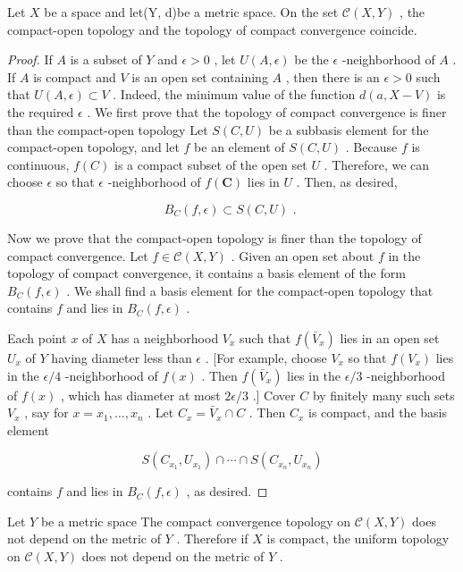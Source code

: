 \begin{theorem} Let \(X\) be a space and let(Y, d)be a metric space. On the set \(\mathcal{C}\left( {X,Y}\right)\) , the compact-open topology and the topology of compact convergence coincide.
\end{theorem}

\begin{proof}If \(A\) is a subset of \(Y\) and \(\epsilon  > 0\) , let \(U\left( {A,\epsilon }\right)\) be the \(\epsilon\) -neighborhood of \(A\) . If \(A\) is compact and \(V\) is an open set containing \(A\) , then there is an \(\epsilon  > 0\) such that \(U\left( {A,\epsilon }\right)  \subset  V\) . Indeed, the minimum value of the function \(d\left( {a,X - V}\right)\) is the required \(\epsilon\) .
We first prove that the topology of compact convergence is finer than the compact-open topology Let \(S\left( {C,U}\right)\) be a subbasis element for the compact-open topology, and let \(f\) be an element of \(S\left( {C,U}\right)\) . Because \(f\) is continuous, \(f\left( C\right)\) is a compact subset of the open set \(U\) . Therefore, we can choose \(\epsilon\) so that \(\epsilon\) -neighborhood of \(f\left( \mathbf{C}\right)\) lies in \(U\) . Then, as desired,

\[
{B}_{C}\left( {f,\epsilon }\right)  \subset  S\left( {C,U}\right) \text{ . }
\]

Now we prove that the compact-open topology is finer than the topology of compact convergence. Let \(f \in  \mathcal{C}\left( {X,Y}\right)\) . Given an open set about \(f\) in the topology of compact convergence, it contains a basis element of the form \({B}_{C}\left( {f,\epsilon }\right)\) . We shall find a basis element for the compact-open topology that contains \(f\) and lies in \({B}_{C}\left( {f,\epsilon }\right)\) .

Each point \(x\) of \(X\) has a neighborhood \({V}_{x}\) such that \(f\left( {\bar{V}}_{x}\right)\) lies in an open set \({U}_{x}\) of \(Y\) having diameter less than \(\epsilon\) . [For example, choose \({V}_{x}\) so that \(f\left( {V}_{x}\right)\) lies in the \(\epsilon /4\) -neighborhood of \(f\left( x\right)\) . Then \(f\left( {\bar{V}}_{x}\right)\) lies in the \(\epsilon /3\) -neighborhood of \(f\left( x\right)\) , which has diameter at most \({2\epsilon }/3\) .] Cover \(C\) by finitely many such sets \({V}_{x}\) , say for \(x = {x}_{1},\ldots ,{x}_{n}\) . Let \({C}_{x} = {\bar{V}}_{x} \cap  C\) . Then \({C}_{x}\) is compact, and the basis element

\[
S\left( {{C}_{{x}_{1}},{U}_{{x}_{1}}}\right)  \cap  \cdots  \cap  S\left( {{C}_{{x}_{n}},{U}_{{x}_{n}}}\right)
\]

contains \(f\) and lies in \({B}_{C}\left( {f,\epsilon }\right)\) , as desired.
\end{proof}
\begin{corollary} Let \(Y\) be a metric space The compact convergence topology on \(\mathcal{C}\left( {X,Y}\right)\) does not depend on the metric of \(Y\) . Therefore if \(X\) is compact, the uniform topology on \(\mathcal{C}\left( {X,Y}\right)\) does not depend on the metric of \(Y\) .
\end{corollary}

